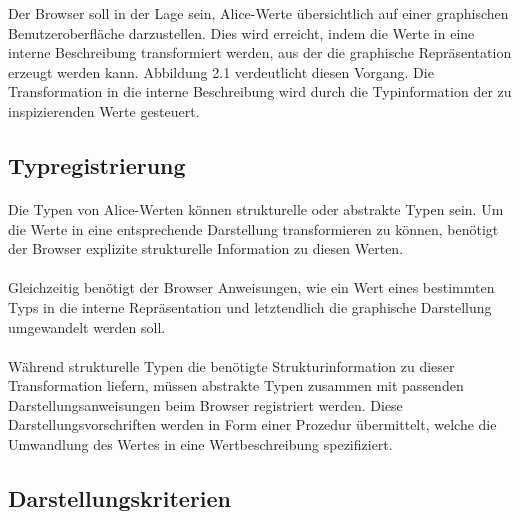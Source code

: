 \documentclass[12pt,a4paper]{article}
\begin{document}
Der Browser soll in der Lage sein, Alice-Werte 
\"ubersichtlich auf einer graphischen Benutzeroberfl\"ache  darzustellen. 
Dies wird erreicht, indem die Werte in eine interne Beschreibung 
transformiert werden, aus der die graphische Repr\"asentation 
erzeugt werden kann. Abbildung 2.1 verdeutlicht diesen Vorgang. 
Die Transformation in die interne Beschreibung wird durch die 
Typinformation der zu inspizierenden Werte gesteuert. 


\subsection{Typregistrierung}

\paragraph{}

Die Typen von Alice-Werten k\"onnen strukturelle oder abstrakte Typen 
sein. Um die Werte in eine entsprechende Darstellung transformieren 
zu k\"onnen, ben\"otigt der Browser explizite strukturelle  
Information zu diesen Werten. 

\paragraph{}

Gleichzeitig ben\"otigt der Browser Anweisungen, wie 
ein Wert eines bestimmten Typs in die interne 
Repr\"asentation und letztendlich die graphische Darstellung 
umgewandelt werden soll.

\paragraph{}

W\"ahrend strukturelle Typen die ben\"otigte Strukturinformation 
zu dieser Transformation liefern, m\"ussen abstrakte Typen 
zusammen mit passenden Darstellungsanweisungen beim Browser 
registriert werden. 
Diese Darstellungsvorschriften werden in Form einer 
Prozedur \"ubermittelt, welche die Umwandlung des Wertes in eine 
Wertbeschreibung spezifiziert.  

\subsection{Darstellungskriterien}

\paragraph{}
\end{document}
